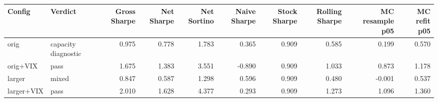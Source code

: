 \begin{tabular}{llrrrrrrrr}
\toprule
Config & Verdict & Gross Sharpe & Net Sharpe & Net Sortino & Naive Sharpe & Stock Sharpe & Rolling Sharpe & MC resample p05 & MC refit p05 \\
\midrule
orig & capacity diagnostic & 0.975 & 0.778 & 1.783 & 0.365 & 0.909 & 0.585 & 0.199 & 0.570 \\
orig+VIX & pass & 1.675 & 1.383 & 3.551 & -0.890 & 0.909 & 1.033 & 0.873 & 1.178 \\
larger & mixed & 0.847 & 0.587 & 1.298 & 0.596 & 0.909 & 0.480 & -0.001 & 0.537 \\
larger+VIX & pass & 2.010 & 1.628 & 4.377 & 0.293 & 0.909 & 1.273 & 1.096 & 1.360 \\
\bottomrule
\end{tabular}
